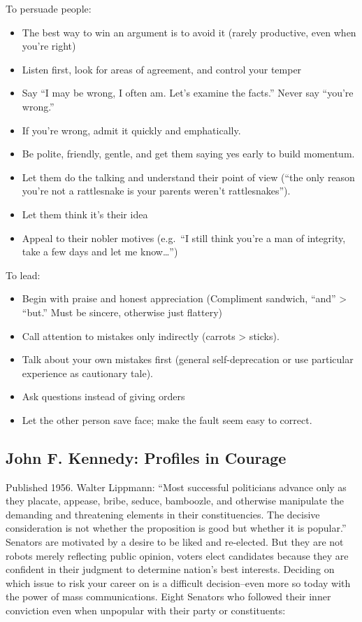 \documentclass[
]{article}
\begin{document}
To persuade people:

\begin{itemize}
\item
  The best way to win an argument is to avoid it (rarely productive,
  even when you're right)
\item
  Listen first, look for areas of agreement, and control your temper
\item
  Say ``I may be wrong, I often am. Let's examine the facts.'' Never say
  ``you're wrong.''
\item
  If you're wrong, admit it quickly and emphatically.
\item
  Be polite, friendly, gentle, and get them saying yes early to build
  momentum.
\item
  Let them do the talking and understand their point of view (``the only
  reason you're not a rattlesnake is your parents weren't
  rattlesnakes'').
\item
  Let them think it's their idea
\item
  Appeal to their nobler motives (e.g.~``I still think you're a man of
  integrity, take a few days and let me know\ldots{}'')
\end{itemize}

To lead:

\begin{itemize}
\item
  Begin with praise and honest appreciation (Compliment sandwich,
  ``and'' \textgreater{} ``but.'' Must be sincere, otherwise just
  flattery)
\item
  Call attention to mistakes only indirectly (carrots \textgreater{}
  sticks).
\item
  Talk about your own mistakes first (general self-deprecation or use
  particular experience as cautionary tale).
\item
  Ask questions instead of giving orders
\item
  Let the other person save face; make the fault seem easy to correct.
\end{itemize}

\hypertarget{john-f.-kennedy-profiles-in-courage}{%
\subsection{John F. Kennedy: Profiles in
Courage}\label{john-f.-kennedy-profiles-in-courage}}

Published 1956. Walter Lippmann: ``Most successful politicians advance
only as they placate, appease, bribe, seduce, bamboozle, and otherwise
manipulate the demanding and threatening elements in their
constituencies. The decisive consideration is not whether the
proposition is good but whether it is popular.'' Senators are motivated
by a desire to be liked and re-elected. But they are not robots merely
reflecting public opinion, voters elect candidates because they are
confident in their judgment to determine nation's best interests.
Deciding on which issue to risk your career on is a difficult
decision--even more so today with the power of mass communications.
Eight Senators who followed their inner conviction even when unpopular
with their party or constituents:
\end{document}
